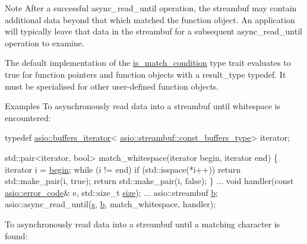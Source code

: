 \begin{DoxyNote}{Note}
After a successful async\+\_\+read\+\_\+until operation, the streambuf may contain additional data beyond that which matched the function object. An application will typically leave that data in the streambuf for a subsequent async\+\_\+read\+\_\+until operation to examine.

The default implementation of the {\ttfamily \hyperlink{structasio_1_1is__match__condition}{is\+\_\+match\+\_\+condition}} type trait evaluates to true for function pointers and function objects with a {\ttfamily result\+\_\+type} typedef. It must be specialised for other user-\/defined function objects.
\end{DoxyNote}
\begin{DoxyParagraph}{Examples}
To asynchronously read data into a streambuf until whitespace is encountered\+: 
\begin{DoxyCode}
 \textcolor{keyword}{typedef} \hyperlink{classasio_1_1buffers__iterator}{asio::buffers\_iterator}<
    \hyperlink{classasio_1_1const__buffers__1}{asio::streambuf::const\_buffers\_type}> iterator;

std::pair<iterator, bool>
match\_whitespace(iterator begin, iterator end)
\{
  iterator i = \hyperlink{group__async__connect_ga7055bca9225050c030c19c7dc926fa53}{begin};
  \textcolor{keywordflow}{while} (i != end)
    \textcolor{keywordflow}{if} (std::isspace(*i++))
      \textcolor{keywordflow}{return} std::make\_pair(i, \textcolor{keyword}{true});
  \textcolor{keywordflow}{return} std::make\_pair(i, \textcolor{keyword}{false});
\}
...
void handler(\textcolor{keyword}{const} \hyperlink{classasio_1_1error__code}{asio::error\_code}& e, std::size\_t \hyperlink{namespaceuva_1_1utils_1_1containers_aea6a0a858974dd7edb4227dcbcbc1eb6a0be5bdf7cf8c7c58d0bc5678caa07791}{size});
...
asio::streambuf \hyperlink{group__async__read_ga945a5c18fa77a9e2eba420f8f44b2a4f}{b};
asio::async\_read\_until(\hyperlink{group__async__connect_ga31ab74b9ea6c77932dddd016cfc7920a}{s}, \hyperlink{group__async__read_ga945a5c18fa77a9e2eba420f8f44b2a4f}{b}, match\_whitespace, handler);
\end{DoxyCode}

\end{DoxyParagraph}
To asynchronously read data into a streambuf until a matching character is found\+: 
